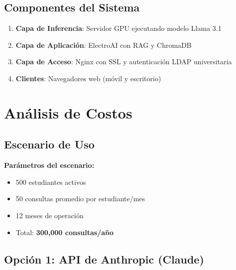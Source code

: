 \documentclass[12pt,letterpaper]{article}
\begin{document}
\subsection{Componentes del Sistema}

\begin{enumerate}
    \item \textbf{Capa de Inferencia}: Servidor GPU ejecutando modelo Llama 3.1
    \item \textbf{Capa de Aplicaci\'on}: ElectroAI con RAG y ChromaDB
    \item \textbf{Capa de Acceso}: Nginx con SSL y autenticaci\'on LDAP universitaria
    \item \textbf{Clientes}: Navegadores web (m\'ovil y escritorio)
\end{enumerate}

\section{An\'alisis de Costos}

\subsection{Escenario de Uso}

\begin{tcolorbox}[colback=secondary!10, colframe=secondary]
\textbf{Par\'ametros del escenario:}
\begin{itemize}[noitemsep]
    \item 500 estudiantes activos
    \item 50 consultas promedio por estudiante/mes
    \item 12 meses de operaci\'on
    \item Total: \textbf{300,000 consultas/a\~no}
\end{itemize}
\end{tcolorbox}

\subsection{Opci\'on 1: API de Anthropic (Claude)}
\end{document}
